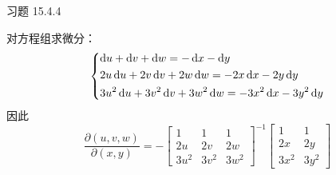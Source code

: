 \begin{problem}
    习题 15.4.4
    \begin{solution}
        对方程组求微分：
        $$
        \begin{dcases}
            \dd{u} + \dd{v} + \dd{w} = - \dd{x} - \dd{y} \\
            2u \dd{u} + 2v \dd{v} + 2w \dd{w} = -2x \dd{x} - 2y \dd{y} \\
            3u^2 \dd{u} + 3v^2 \dd{v} + 3w^2 \dd{w} = -3x^2 \dd{x} - 3y^2 \dd{y} \\
        \end{dcases}
        $$
        因此
        $$
        \frac{\partial(u, v, w)}{\partial(x, y)} = -\begin{bmatrix}
            1 & 1 & 1 \\
            2u & 2v & 2w \\
            3u^2 & 3v^2 & 3w^2
        \end{bmatrix}^{-1} \begin{bmatrix}
            1 & 1 \\
            2x & 2y \\
            3x^2 & 3y^2
        \end{bmatrix}
        $$
    \end{solution}
\end{problem}

